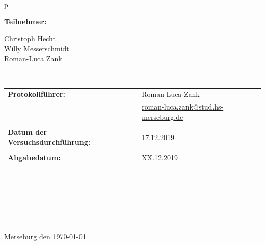 \begin{center}
\begin{tabular}{p{\textwidth}}
\begin{center}
\Large{\textbf{Teilnehmer:}} \\ 
\end{center}
\begin{center}
\large{Christoph Hecht \\
	Willy Messerschmidt \\
	Roman-Luca Zank} \\
\end{center}


\\

\begin{center}
\begin{tabular}{lll}
\large{\textbf{Protokollführer:}} & & \large{Roman-Luca Zank} \\
& & \href{mailto:roman-luca.zank@stud.hs-merseburg.de}{{\footnotesize roman-luca.zank@stud.hs-merseburg.de}}\\
&&\\
\large{\textbf{Datum der Versuchsdurchführung:}}&& \large{17.12.2019}\\
&&\\
\large{\textbf{Abgabedatum:}}&& \large{XX.12.2019}
\end{tabular}
\end{center}

\\ \\ \\ \\ \\ \\ 
\large{Merseburg den \today}

\end{tabular}
\end{center}

